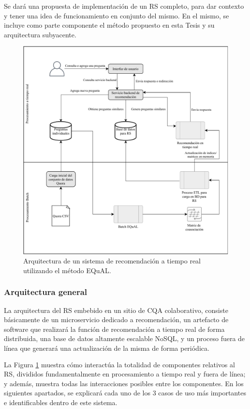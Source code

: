 \bigskip Se dará una propuesta de implementación de un RS completo, para dar contexto y tener una idea de funcionamiento en conjunto del mismo. En el mismo, se incluye como parte componente el método propuesto en esta Tesis y su arquitectura subyacente.

\bigskip
\begin{figure}[h!]
	\centering
	\includegraphics[width=0.9\linewidth]{8_problema_investigacion/imagenes/implementacion_rs}
	\caption{Arquitectura de un sistema de recomendación a tiempo real utilizando el método EQuAL.}
	\label{fig:implementacionrs}
\end{figure}

\subsubsection{Arquitectura general}
La arquitectura del RS embebido en un sitio de CQA colaborativo, consiste básicamente de un microservicio dedicado a recomendación, un artefacto de software que realizará la función de recomendación a tiempo real de forma distribuida, una base de datos altamente escalable NoSQL, y un proceso fuera de línea que generará una actualización de la misma de forma periódica.

\bigskip La Figura \ref{fig:implementacionrs} muestra cómo interactúa la totalidad de componentes relativos al RS, divididos fundamentalmente en procesamiento a tiempo real y fuera de línea; y además, muestra todas las interacciones posibles entre los componentes. En los siguientes apartados, se explicará cada uno de los 3 casos de uso más importantes e identificables dentro de este sistema.


